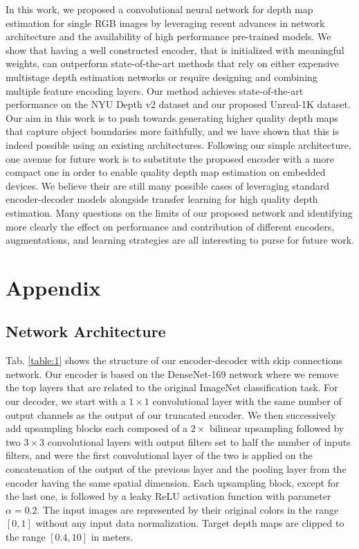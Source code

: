 \documentclass[10pt,twocolumn,letterpaper]{article}
\begin{document}
In this work, we proposed a convolutional neural network for depth map estimation for single RGB images by leveraging recent advances in network architecture and the availability of high performance pre-trained models. We show that having a well constructed encoder, that is initialized with meaningful weights, can outperform state-of-the-art methods that rely on either expensive multistage depth estimation networks or require designing and combining multiple feature encoding layers. Our method achieves state-of-the-art performance on the NYU Depth v2 dataset and our proposed Unreal-1K dataset. Our aim in this work is to push towards generating higher quality depth maps that capture object boundaries more faithfully, and we have shown that this is indeed possible using an existing architectures. Following our simple architecture, one avenue for future work is to substitute the proposed encoder with a more compact one in order to enable quality depth map estimation on embedded devices. We believe their are still many possible cases of leveraging standard encoder-decoder models alongside transfer learning for high quality depth estimation. Many questions on the limits of our proposed network and identifying more clearly the effect on performance and contribution of different encoders, augmentations, and learning strategies are all interesting to purse for future work.

{ \small   }

\appendix

\section{Appendix}

\subsection{Network Architecture}

Tab. \ref{table:1} shows the structure of our encoder-decoder with skip connections network. Our encoder is based on the DenseNet-169 \cite{huang2017densely} network where we remove the top layers that are related to the original ImageNet classification task. For our decoder, we start with a $1 \times 1$ convolutional layer with the same number of output channels as the output of our truncated encoder. We then successively add upsampling blocks each composed of a $2\times$ bilinear upsampling followed by two $3 \times 3$ convolutional layers with output filters set to half the number of inputs filters, and were the first convolutional layer of the two is applied on the concatenation of the output of the previous layer and the pooling layer from the encoder having the same spatial dimension. Each upsampling block, except for the last one, is followed by a leaky ReLU activation function \cite{Maas13LeRELU} with parameter $\alpha=0.2$. The input images are represented by their original colors in the range $[0,1]$ without any input data normalization. Target depth maps are clipped to the range $[0.4, 10]$ in meters.
\end{document}
